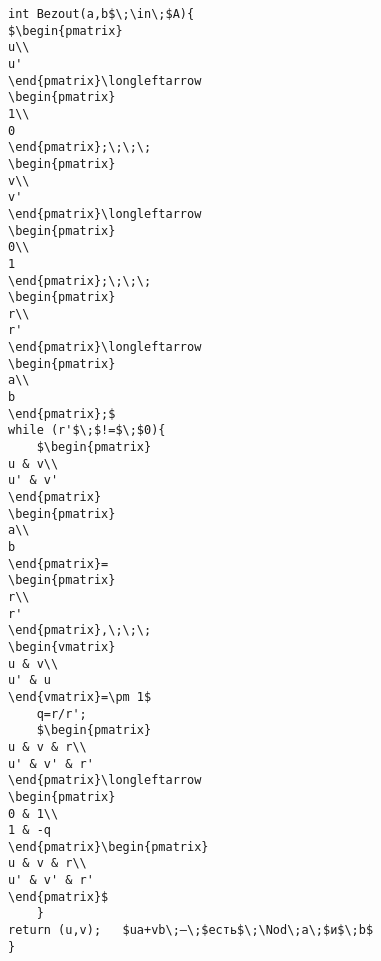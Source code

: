 \documentclass{mai_book}
\begin{document}
\begin{framed}

\begin{lstlisting}[frame=none, mathescape=true, caption=Алгоритм Безу для квазиевклидова кольца]
int Bezout(a,b$\;\in\;$A){
$\begin{pmatrix}
u\\
u'
\end{pmatrix}\longleftarrow
\begin{pmatrix}
1\\
0
\end{pmatrix};\;\;\;
\begin{pmatrix}
v\\
v'
\end{pmatrix}\longleftarrow
\begin{pmatrix}
0\\
1
\end{pmatrix};\;\;\;
\begin{pmatrix}
r\\
r'
\end{pmatrix}\longleftarrow
\begin{pmatrix}
a\\
b
\end{pmatrix};$
while (r'$\;$!=$\;$0){
	$\begin{pmatrix}
u & v\\
u' & v'
\end{pmatrix}
\begin{pmatrix}
a\\
b
\end{pmatrix}=
\begin{pmatrix}
r\\
r'
\end{pmatrix},\;\;\;
\begin{vmatrix}
u & v\\
u' & u
\end{vmatrix}=\pm 1$
	q=r/r';
	$\begin{pmatrix}
u & v & r\\
u' & v' & r'
\end{pmatrix}\longleftarrow
\begin{pmatrix}
0 & 1\\
1 & -q
\end{pmatrix}\begin{pmatrix}
u & v & r\\
u' & v' & r'
\end{pmatrix}$
	}
return (u,v);	$ua+vb\;—\;$есть$\;\Nod\;a\;$и$\;b$
}
\end{lstlisting}
\end{framed}
\end{document}
